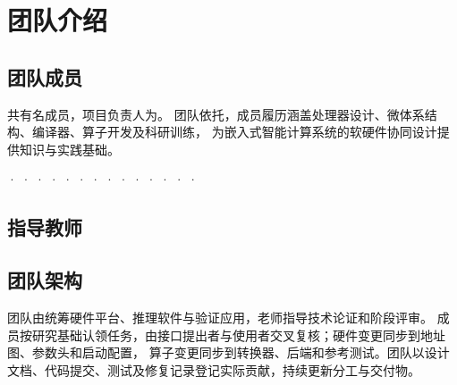 \section{团队介绍}
\subsection{团队成员}

\TeamName{}共有\TeamSize{}名成员，项目负责人为\TeamLeader{}。
团队依托\TeamAffiliation{}，成员履历涵盖处理器设计、微体系结构、编译器、算子开发及科研训练，
为嵌入式智能计算系统的软硬件协同设计提供知识与实践基础。

\TeamMemberProfile{\MemberOnePhoto}{\MemberOneName}{\MemberOneRole}
  {\MemberOneSchool{} · \MemberOneGrade{} · \MemberOneMajor}{\MemberOneBio}
\TeamMemberProfile{\MemberTwoPhoto}{\MemberTwoName}{\MemberTwoRole}
  {\MemberTwoSchool{} · \MemberTwoGrade{} · \MemberTwoMajor}{\MemberTwoBio}
\TeamMemberProfile{\MemberThreePhoto}{\MemberThreeName}{\MemberThreeRole}
  {\MemberThreeSchool{} · \MemberThreeGrade{} · \MemberThreeMajor}{\MemberThreeBio}
\TeamMemberProfile{\MemberFourPhoto}{\MemberFourName}{\MemberFourRole}
  {\MemberFourSchool{} · \MemberFourGrade{} · \MemberFourMajor}{\MemberFourBio}
\TeamMemberProfile{\MemberFivePhoto}{\MemberFiveName}{\MemberFiveRole}
  {\MemberFiveSchool{} · \MemberFiveGrade{} · \MemberFiveMajor}{\MemberFiveBio}
\TeamMemberProfile{\MemberSixPhoto}{\MemberSixName}{\MemberSixRole}
  {\MemberSixSchool{} · \MemberSixGrade{} · \MemberSixMajor}{\MemberSixBio}
\TeamMemberProfile{\MemberSevenPhoto}{\MemberSevenName}{\MemberSevenRole}
  {\MemberSevenSchool{} · \MemberSevenGrade{} · \MemberSevenMajor}{\MemberSevenBio}

\subsection{指导教师}
\TeamAdvisorProfile{\AdvisorName}{\AdvisorRole}

\subsection{团队架构}
团队由\TeamLeader{}统筹硬件平台、推理软件与验证应用，\AdvisorName{}老师指导技术论证和阶段评审。
成员按研究基础认领任务，由接口提出者与使用者交叉复核；硬件变更同步到地址图、参数头和启动配置，
算子变更同步到转换器、后端和参考测试。团队以设计文档、代码提交、测试及修复记录登记实际贡献，持续更新分工与交付物。\cite{reviewrules}
